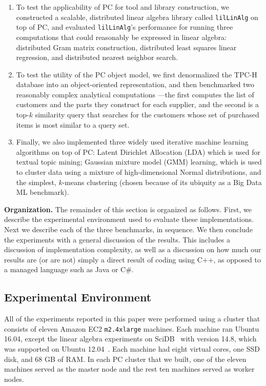 \begin {enumerate}
\item To test the applicability of PC for tool and library construction, we constructed a scalable, distributed
linear algebra library
called \texttt{lilLinAlg} on top of PC, and evaluated \texttt{lilLinAlg}'s performance for running three
computations that could reasonably be expressed in linear algebra: distributed Gram matrix construction, 
distributed least squares linear regression, and distributed nearest neighbor search.

\item To test the utility of the PC object model, we first denormalized the TPC-H database \cite{council2008tpc} into an object-oriented 
representation, and then benchmarked two reasonably complex 
analytical computations ---the
first computes the list of customers and the parts they construct for each supplier, and the
second is a top-$k$ similarity query that searches for the customers whose set of purchased items is most similar
to a query set.

\item Finally, we also implemented three widely used
  iterative machine learning algorithms on top of PC: Latent Dirichlet Allocation (LDA) which is used for
  textual topic mining;
  Gaussian mixture model (GMM) learning, which is used to cluster data using a mixture of high-dimensional Normal
  distributions, and the simplest, $k$-means clustering (chosen because of its ubiquity as a Big Data ML benchmark).
\end {enumerate}

\vspace{5 pt}
\noindent
\textbf{Organization.}  The remainder of this section is organized as follows.  First, we describe the experimental
environment used to evaluate these implementations.  
Next we describe each of the three benchmarks, in sequence. We then conclude the experiments with a general
discussion of the results.  This includes a discussion of implementation complexity, as well as a discussion on how much
our results are (or are not) simply a direct result of coding using C++, as opposed to a managed language such as Java or
C\#.

\subsection {Experimental Environment}

All of the experiments reported in this paper were performed using a
cluster that consists of eleven Amazon EC2 \texttt{m2.4xlarge}
machines. Each machine
ran Ubuntu 16.04, except the linear algebra experiments on
SciDB~\cite{brown2010overview, stonebraker2011architecture}
with version 14.8, which
was supported on Ubuntu 12.04~\cite{SciDBOS}.
Each machine had eight virtual cores, one SSD
disk, and 68 GB of RAM. In each PC cluster that we built, one of the eleven machines served as the master
node and the rest ten machines served as worker nodes.

